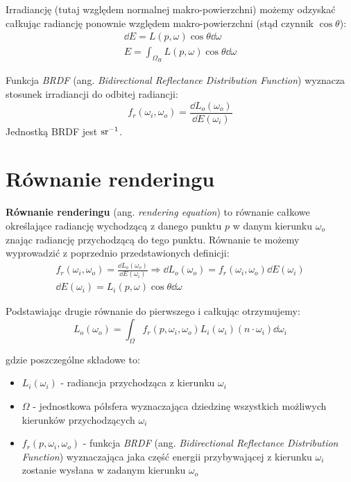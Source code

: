\documentclass[../main.tex]{subfiles}
\begin{document}
Irradiancję (tutaj względem normalnej makro-powierzchni) możemy odzyskać całkując radiancję ponownie względem makro-powierzchni (stąd czynnik $\cos\theta$):
\begin{gather*}
    \dd E = L(p, \omega) \cos\theta \dd \omega \\
    E = \int_{\Omega_H}{L(p, \omega) \cos\theta \dd \omega}
\end{gather*}

Funkcja \textit{BRDF} (ang. \textit{Bidirectional Reflectance Distribution Function}) wyznacza stosunek irradiancji do odbitej radiancji:
\[
f_r(\omega_i, \omega_o) = \frac{
    \dd L_{o}(\omega_o)
}{
    \dd E(\omega_i)
}
\]
\noindent Jednostką BRDF jest $\si[per-mode=reciprocal]{\per\steradian}$.

\section{Równanie renderingu}

\textbf{Równanie renderingu} (ang. \textit{rendering equation}) to równanie
całkowe określające radiancję wychodzącą z danego punktu $p$ w danym kierunku
$\omega_o$ znając radiancję przychodzącą do tego punktu. Równanie te możemy
wyprowadzić z poprzednio przedstawionych definicji:
\begin{gather*}
    f_r(\omega_i, \omega_o) = \frac{
        \dd L_{o}(\omega_o)
    }{
        \dd E(\omega_i)
    } \Rightarrow 
    \dd L_{o}(\omega_o) =  f_r(\omega_i, \omega_o) \dd E(\omega_i) \\
    \dd E(\omega_i) = L_i(p, \omega) \cos\theta \dd\omega
\end{gather*}

Podstawiając drugie równanie do pierwszego i całkując otrzymujemy:
\[
  L_{o}(\omega_o) =
  \int_{\Omega} {
    f_r(p, \omega_i, \omega_o)
    L_i(\omega_i)
    (n \cdot \omega_i)
    \dd{\omega_i}
  }
\]

\noindent gdzie poszczególne składowe to:

\begin{itemize}

  \item $L_i(\omega_i)$ - radiancja przychodząca z kierunku $\omega_i$

  \item $\Omega$ - jednostkowa półsfera wyznaczająca dziedzinę wszystkich
    możliwych kierunków przychodzących $\omega_i$

  \item $f_{r}(p, \omega_i, \omega_o)$ - funkcja \textit{BRDF} (ang.
    \textit{Bidirectional Reflectance Distribution Function}) wyznaczająca jaka
    część energii przybywającej z kierunku $\omega_i$ zostanie wysłana w zadanym kierunku $\omega_o$

\end{itemize}
\end{document}
